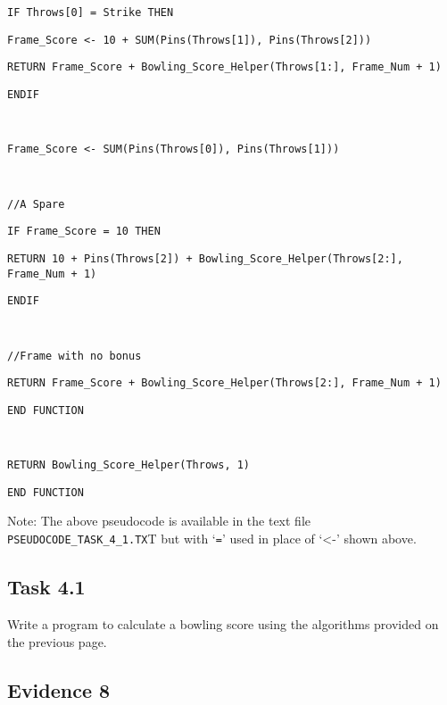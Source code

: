\begin{minipage}[t]{1\columnwidth}
\texttt{\qquad{}\qquad{}IF Throws{[}0{]} = Strike THEN}

\texttt{\qquad{}\qquad{}\qquad{}Frame\_Score <- 10 + SUM(Pins(Throws{[}1{]}),
Pins(Throws{[}2{]}))}

\texttt{\qquad{}\qquad{}\qquad{}RETURN Frame\_Score + Bowling\_Score\_Helper(Throws{[}1:{]},
Frame\_Num + 1) }

\texttt{\qquad{}\qquad{}ENDIF}

\texttt{\bigskip{}
}

\texttt{\qquad{}\qquad{}Frame\_Score <- SUM(Pins(Throws{[}0{]}),
Pins(Throws{[}1{]}))}

\texttt{\bigskip{}
}

\texttt{\qquad{}\qquad{}//A Spare}

\texttt{\qquad{}\qquad{}IF Frame\_Score = 10 THEN}

\texttt{\qquad{}\qquad{}\qquad{}RETURN 10 + Pins(Throws{[}2{]})
+ Bowling\_Score\_Helper(Throws{[}2:{]}, Frame\_Num + 1)}

\texttt{\qquad{}\qquad{}ENDIF}

\texttt{\bigskip{}
}

\texttt{\qquad{}\qquad{}//Frame with no bonus }

\texttt{\qquad{}\qquad{}RETURN Frame\_Score + Bowling\_Score\_Helper(Throws{[}2:{]},
Frame\_Num + 1)}

\texttt{\qquad{}END FUNCTION}

\texttt{\bigskip{}
}

\texttt{\qquad{}RETURN Bowling\_Score\_Helper(Throws, 1) }

\texttt{END FUNCTION }%
\end{minipage}

Note: The above pseudocode is available in the text file \texttt{PSEUDOCODE\_TASK\_4\_1.TX}T
but with \textquoteleft \texttt{=}\textquoteright{} used in place
of \textquoteleft <-\textquoteright{} shown above.

\subsection*{Task 4.1 }

Write a program to calculate a bowling score using the algorithms
provided on the previous page.

\subsection*{Evidence 8 }

